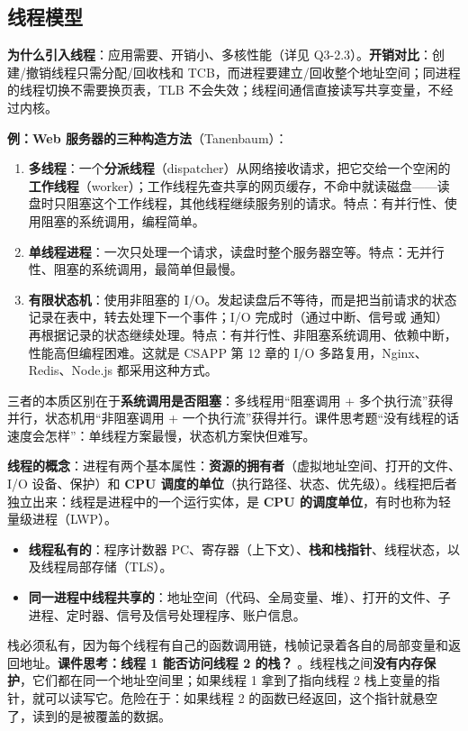 \subsection{线程模型}

\textbf{为什么引入线程}：应用需要、开销小、多核性能（详见 Q3-2.3）。\textbf{开销对比}：创建/撤销线程只需分配/回收栈和 TCB，而进程要建立/回收整个地址空间；同进程的线程切换不需要换页表，TLB 不会失效；线程间通信直接读写共享变量，不经过内核。

\textbf{例：Web 服务器的三种构造方法}（Tanenbaum）：
\begin{enumerate}
    \item \textbf{多线程}：一个\textbf{分派线程}（dispatcher）从网络接收请求，把它交给一个空闲的\textbf{工作线程}（worker）；工作线程先查共享的网页缓存，不命中就读磁盘——读盘时只阻塞这个工作线程，其他线程继续服务别的请求。特点：有并行性、使用阻塞的系统调用，编程简单。
    \item \textbf{单线程进程}：一次只处理一个请求，读盘时整个服务器空等。特点：无并行性、阻塞的系统调用，最简单但最慢。
    \item \textbf{有限状态机}：使用非阻塞的 I/O。发起读盘后不等待，而是把当前请求的状态记录在表中，转去处理下一个事件；I/O 完成时（通过中断、信号或  通知）再根据记录的状态继续处理。特点：有并行性、非阻塞系统调用、依赖中断，性能高但编程困难。这就是 CSAPP 第 12 章的 I/O 多路复用，Nginx、Redis、Node.js 都采用这种方式。
\end{enumerate}
三者的本质区别在于\textbf{系统调用是否阻塞}：多线程用“阻塞调用 + 多个执行流”获得并行，状态机用“非阻塞调用 + 一个执行流”获得并行。课件思考题“没有线程的话速度会怎样”：单线程方案最慢，状态机方案快但难写。

\textbf{线程的概念}：进程有两个基本属性：\textbf{资源的拥有者}（虚拟地址空间、打开的文件、I/O 设备、保护）和 \textbf{CPU 调度的单位}（执行路径、状态、优先级）。线程把后者独立出来：线程是进程中的一个运行实体，是 \textbf{CPU 的调度单位}，有时也称为轻量级进程（LWP）。
\begin{itemize}
    \item \textbf{线程私有的}：程序计数器 PC、寄存器（上下文）、\textbf{栈和栈指针}、线程状态，以及线程局部存储（TLS）。
    \item \textbf{同一进程中线程共享的}：地址空间（代码、全局变量、堆）、打开的文件、子进程、定时器、信号及信号处理程序、账户信息。
\end{itemize}
栈必须私有，因为每个线程有自己的函数调用链，栈帧记录着各自的局部变量和返回地址。\ez \textbf{课件思考：线程 1 能否访问线程 2 的栈？} 。线程栈之间\textbf{没有内存保护}，它们都在同一个地址空间里；如果线程 1 拿到了指向线程 2 栈上变量的指针，就可以读写它。危险在于：如果线程 2 的函数已经返回，这个指针就悬空了，读到的是被覆盖的数据。

